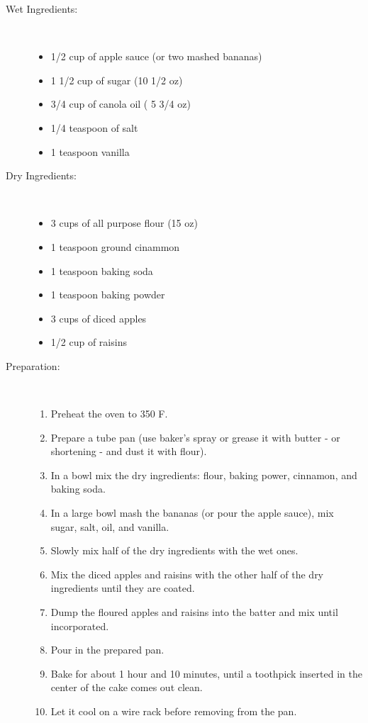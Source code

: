 \documentclass[11pt,letterpaper]{article}
\begin{document}


\begin{description}

\item[Wet Ingredients:]\  \newline
	\begin{itemize}
	\item 1/2 cup of apple sauce (or two mashed bananas)
	\item 1 1/2 cup of sugar (10 1/2 oz)
	\item 3/4 cup of canola oil ( 5 3/4 oz)
	\item 1/4 teaspoon of salt
	\item 1 teaspoon vanilla
	\end{itemize}

\item[Dry Ingredients:]\ \newline
	\begin{itemize}
	\item 3 cups of all purpose flour (15 oz)
	\item 1 teaspoon ground cinammon
	\item 1 teaspoon baking soda
	\item 1 teaspoon baking powder
	\item 3 cups of diced apples
	\item 1/2 cup of raisins
	\end{itemize}

\item[Preparation:]\ \newline
\begin{enumerate}
\item Preheat the oven to 350 F.
\item Prepare a tube pan (use baker's spray or grease it with butter - or
   shortening - and dust it with flour).
\item In a bowl mix the dry ingredients: flour, baking power, cinnamon,
   and baking soda.        
\item In a large bowl mash the bananas (or pour the apple sauce), mix
   sugar, salt, oil, and vanilla.
\item Slowly mix half of the dry ingredients with the wet ones.
\item Mix the diced apples and raisins with the other half of the dry ingredients until they are coated.
\item Dump the floured apples and raisins into the batter and mix until incorporated.
\item Pour in the prepared pan.
\item Bake for about 1 hour and 10 minutes, until a toothpick inserted in
   the center of the cake comes out clean.
\item Let it cool on a wire rack before removing from the pan.
\end{enumerate}
\end{description}
\end{document}
